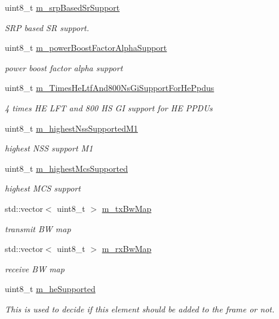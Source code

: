 \begin{DoxyCompactItemize}
uint8\+\_\+t \hyperlink{classns3_1_1HeCapabilities_a2abcfc2454d3507833dcef612610b48b}{m\+\_\+srp\+Based\+Sr\+Support}
\begin{DoxyCompactList}\small\item\em S\+RP based SR support. \end{DoxyCompactList}\item 
uint8\+\_\+t \hyperlink{classns3_1_1HeCapabilities_ab121dcfc4c94858e252398cc7a060827}{m\+\_\+power\+Boost\+Factor\+Alpha\+Support}
\begin{DoxyCompactList}\small\item\em power boost factor alpha support \end{DoxyCompactList}\item 
uint8\+\_\+t \hyperlink{classns3_1_1HeCapabilities_aaf569f297a059a329925c6789f2b1266}{m\+\_\+Times\+He\+Ltf\+And800\+Ns\+Gi\+Support\+For\+He\+Ppdus}
\begin{DoxyCompactList}\small\item\em 4 times HE L\+FT and 800 HS GI support for HE P\+P\+D\+Us \end{DoxyCompactList}\item 
uint8\+\_\+t \hyperlink{classns3_1_1HeCapabilities_ae57448a35564e5ca6ef6a61be6417af0}{m\+\_\+highest\+Nss\+Supported\+M1}
\begin{DoxyCompactList}\small\item\em highest N\+SS support M1 \end{DoxyCompactList}\item 
uint8\+\_\+t \hyperlink{classns3_1_1HeCapabilities_a85706b05f4879ec9a9343aaa00137a9e}{m\+\_\+highest\+Mcs\+Supported}
\begin{DoxyCompactList}\small\item\em highest M\+CS support \end{DoxyCompactList}\item 
std\+::vector$<$ uint8\+\_\+t $>$ \hyperlink{classns3_1_1HeCapabilities_ad6af160216c8873823a05b0961bd3300}{m\+\_\+tx\+Bw\+Map}
\begin{DoxyCompactList}\small\item\em transmit BW map \end{DoxyCompactList}\item 
std\+::vector$<$ uint8\+\_\+t $>$ \hyperlink{classns3_1_1HeCapabilities_a59be329f6c16d697e891f1fabc51e37f}{m\+\_\+rx\+Bw\+Map}
\begin{DoxyCompactList}\small\item\em receive BW map \end{DoxyCompactList}\item 
uint8\+\_\+t \hyperlink{classns3_1_1HeCapabilities_aa17d6ec2845446ce11fffbbf5db024a7}{m\+\_\+he\+Supported}
\begin{DoxyCompactList}\small\item\em This is used to decide if this element should be added to the frame or not. \end{DoxyCompactList}\end{DoxyCompactItemize}
